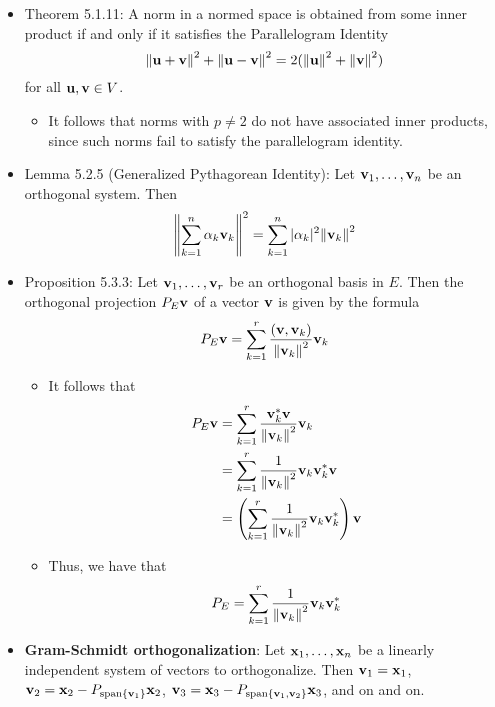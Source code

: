 \documentclass[../../notes.tex]{subfiles}
\begin{document}
\begin{itemize}
    \item Theorem 5.1.11: A norm in a normed space is obtained from some inner product if and only if it satisfies the Parallelogram Identity
    \begin{equation*}
        \norm{\mathbf{u}+\mathbf{v}}^2+\norm{\mathbf{u}-\mathbf{v}}^2 = 2(\norm{\mathbf{u}}^2+\norm{\mathbf{v}}^2)
    \end{equation*}
    for all $\mathbf{u},\mathbf{v}\in V$.
    \begin{itemize}
        \item It follows that norms with $p\neq 2$ do not have associated inner products, since such norms fail to satisfy the parallelogram identity.
    \end{itemize}
    \item Lemma 5.2.5 (Generalized Pythagorean Identity): Let $\mathbf{v}_1,\dots,\mathbf{v}_n$ be an orthogonal system. Then
    \begin{equation*}
        \norm{\sum_{k=1}^n\alpha_k\mathbf{v}_k}^2 = \sum_{k=1}^n|\alpha_k|^2\norm{\mathbf{v}_k}^2
    \end{equation*}
    \item Proposition 5.3.3: Let $\mathbf{v}_1,\dots,\mathbf{v}_r$ be an orthogonal basis in $E$. Then the orthogonal projection $P_E\mathbf{v}$ of a vector $\mathbf{v}$ is given by the formula
    \begin{equation*}
        P_E\mathbf{v} = \sum_{k=1}^r\frac{(\mathbf{v},\mathbf{v}_k)}{\norm{\mathbf{v}_k}^2}\mathbf{v}_k
    \end{equation*}
    \begin{itemize}
        \item It follows that
        \begin{align*}
            P_E\mathbf{v} &= \sum_{k=1}^r\frac{\mathbf{v}_k^*\mathbf{v}}{\norm{\mathbf{v}_k}^2}\mathbf{v}_k\\
            &= \sum_{k=1}^r\frac{1}{\norm{\mathbf{v}_k}^2}\mathbf{v}_k\mathbf{v}_k^*\mathbf{v}\\
            &= \left( \sum_{k=1}^r\frac{1}{\norm{\mathbf{v}_k}^2}\mathbf{v}_k\mathbf{v}_k^* \right)\mathbf{v}
        \end{align*}
        \item Thus, we have that
        \begin{equation*}
            P_E = \sum_{k=1}^r\frac{1}{\norm{\mathbf{v}_k}^2}\mathbf{v}_k\mathbf{v}_k^*
        \end{equation*}
    \end{itemize}
    \item \textbf{Gram-Schmidt orthogonalization}: Let $\mathbf{x}_1,\dots,\mathbf{x}_n$ be a linearly independent system of vectors to orthogonalize. Then $\mathbf{v}_1=\mathbf{x}_1$, $\mathbf{v}_2=\mathbf{x}_2-P_{\operatorname{span}\{\mathbf{v}_1\}}\mathbf{x}_2$, $\mathbf{v}_3=\mathbf{x}_3-P_{\operatorname{span}\{\mathbf{v}_1,\mathbf{v}_2\}}\mathbf{x}_3$, and on and on.

\end{itemize}
\end{document}
